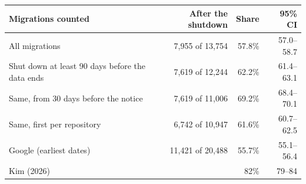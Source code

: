 \begin{tabular}{lrrr}
\toprule
Migrations counted & After the shutdown & Share & 95\% CI \\
\midrule
All migrations & 7,955 of 13,754 & 57.8\% & 57.0--58.7 \\
Shut down at least 90 days before the data ends & 7,619 of 12,244 & 62.2\% & 61.4--63.1 \\
Same, from 30 days before the notice & 7,619 of 11,006 & 69.2\% & 68.4--70.1 \\
Same, first per repository & 6,742 of 10,947 & 61.6\% & 60.7--62.5 \\
Google (earliest dates) & 11,421 of 20,488 & 55.7\% & 55.1--56.4 \\
\midrule
Kim (2026) & & 82\% & 79--84 \\
\bottomrule
\end{tabular}
